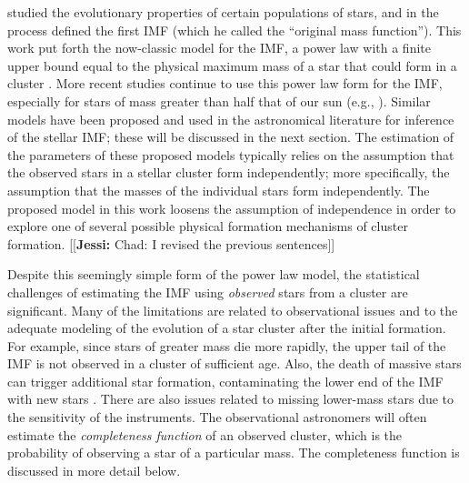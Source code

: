 \documentclass[12pt]{article}
\newcommand{\jessi}[1]{{\color{blue}[[\textbf{Jessi: }#1]]}}
\begin{document}
\cite{salpeter55} studied the evolutionary properties of certain 
populations of stars, and in the process defined the first IMF 
(which he called the ``original mass function'').  
This work put forth the now-classic model for the IMF, a power law 
with a finite upper bound equal to the physical maximum mass of a star that 
could form in a cluster \citep{salpeter55}.  
More recent studies continue to use this power law form for the IMF, especially for stars of mass greater than half that
of our sun (e.g., \citealt{Massey2003, bastian2010, DaRioEtAl2012, Lim2013, weisz13, Weisz:2015kx, Jose2017}).
Similar models have been proposed and used in the astronomical literature for inference of the 
stellar IMF; these will be discussed in the next section. 
The estimation of the parameters of these proposed models typically relies on the assumption that 
the observed stars in a stellar cluster form independently; more specifically, the assumption that the masses of the individual stars form independently. 
The proposed model in this work loosens the assumption of independence in order to explore one of several possible physical formation 
mechanisms of cluster formation.
\jessi{Chad:  I revised the previous sentences}

Despite this seemingly simple form of the power law model, the statistical challenges of estimating the 
IMF using \emph{observed} stars from a cluster are significant. Many of the limitations are related to 
observational issues and to the adequate modeling of the evolution of a star cluster after the 
initial formation. For example, since stars of greater mass die more rapidly, the upper tail of the IMF is 
not observed in a cluster of sufficient age.  
Also, the death of massive stars can trigger additional star formation,
contaminating the lower end of the IMF with new stars \citep{Woosley2015}.
There are also issues related to missing lower-mass stars due to the sensitivity of the instruments.  The observational astronomers will often estimate the \emph{completeness function} of an observed cluster, which is the probability of observing a star of a particular mass.  The completeness function is discussed in more detail below.
\end{document}
